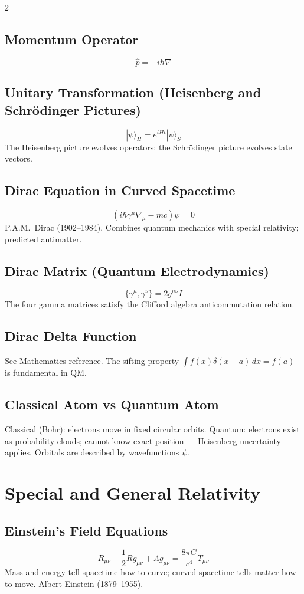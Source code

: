 \documentclass[10pt,a4paper]{article}
\begin{document}
\begin{multicols}{2}
\subsection{Momentum Operator}
\[
\hat{p} = -i\hbar\nabla
\]

\subsection{Unitary Transformation (Heisenberg and Schr\"odinger Pictures)}
\[
|\psi\rangle_H = e^{iHt}|\psi\rangle_S
\]
The Heisenberg picture evolves operators; the Schr\"odinger picture evolves state vectors.

\subsection{Dirac Equation in Curved Spacetime}
\[
(i\hbar\gamma^\mu\nabla_\mu - mc)\psi = 0
\]
P.A.M.\ Dirac (1902--1984). Combines quantum mechanics with special relativity; predicted antimatter.

\subsection{Dirac Matrix (Quantum Electrodynamics)}
\[
\{\gamma^\mu, \gamma^\nu\} = 2g^{\mu\nu}I
\]
The four gamma matrices satisfy the Clifford algebra anticommutation relation.

\subsection{Dirac Delta Function}
See Mathematics reference. The sifting property $\int f(x)\delta(x-a)\,dx = f(a)$ is fundamental in QM.

\subsection{Classical Atom vs Quantum Atom}
Classical (Bohr): electrons move in fixed circular orbits. Quantum: electrons exist as probability clouds; cannot know exact position --- Heisenberg uncertainty applies. Orbitals are described by wavefunctions $\psi$.

\section{Special and General Relativity}

\subsection{Einstein's Field Equations}
\[
R_{\mu\nu} - \frac{1}{2}Rg_{\mu\nu} + \Lambda g_{\mu\nu} = \frac{8\pi G}{c^4}T_{\mu\nu}
\]
Mass and energy tell spacetime how to curve; curved spacetime tells matter how to move. Albert Einstein (1879--1955).


\end{multicols}
\end{document}
